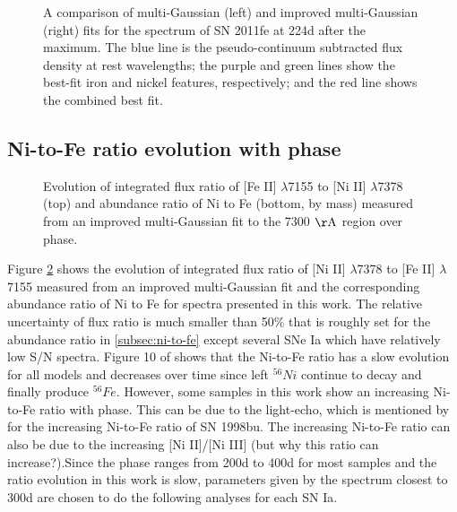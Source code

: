 \documentclass[twocolumn]{aastex631}
\begin{document}
\begin{figure}[ht!]
\caption{A comparison of multi-Gaussian (left) and improved multi-Gaussian (right) fits for the spectrum of SN 2011fe at 224d after the maximum. The blue line is the pseudo-continuum subtracted flux density at rest wavelengths; the purple and green lines show the best-fit iron and nickel features, respectively; and the red line shows the combined best fit.}
\label{fig:11fe_comp}
\end{figure}

\subsection{Ni-to-Fe ratio evolution with phase \label{subsec:ratio_evo}}

\begin{figure}[ht!]
\caption{Evolution of integrated flux ratio of [Fe II] $\lambda$7155 to [Ni II] $\lambda$7378 (top) and abundance ratio of Ni to Fe (bottom, by mass) measured from an improved multi-Gaussian fit to the 7300 $\rm \AA$ region over phase.}
\label{fig:evo_comp}
\end{figure}

Figure \ref{fig:evo_comp} shows the evolution of integrated flux ratio of [Ni II] $\lambda$7378 to [Fe II] $\lambda$7155 measured from an improved multi-Gaussian fit and the corresponding abundance ratio of Ni to Fe for spectra presented in this work. The relative uncertainty of flux ratio is much smaller than 50\% that is roughly set for the abundance ratio in \ref{subsec:ni-to-fe} except several SNe Ia which have relatively low S/N spectra. Figure 10 of \citet{2018MNRAS.477.3567M} shows that the Ni-to-Fe ratio has a slow evolution for all models and decreases over time since left $^{56}Ni$ continue to decay and finally produce $^{56}Fe$. However, some samples in this work show an increasing Ni-to-Fe ratio with phase. This can be due to the light-echo, which is mentioned by \citet{2020MNRAS.491.2902F} for the increasing Ni-to-Fe ratio of SN 1998bu. The increasing Ni-to-Fe ratio can also be due to the increasing [Ni II]/[Ni III] (but why this ratio can increase?).Since the phase ranges from 200d to 400d for most samples and the ratio evolution in this work is slow, parameters given by the spectrum closest to 300d are chosen to do the following analyses for each SN Ia.
\end{document}
